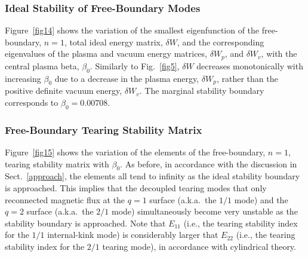 \documentclass[12pt,prb,aps]{revtex4-1}
\begin{document}
\subsubsection{Ideal Stability of Free-Boundary Modes}
Figure~\ref{fig14} shows the variation of the smallest eigenfunction of the free-boundary, $n=1$, 
total ideal energy matrix, $\delta W$, and the corresponding eigenvalues of the plasma and vacuum energy matrices, $\delta W_p$, and $\delta W_v$, with the
central plasma beta, $\beta_0$. Similarly to Fig.~\ref{fig5}, $\delta W$ decreases monotonically with increasing $\beta_0$  due
to a decrease in the plasma energy, $\delta W_p$, rather than the positive definite vacuum energy, $\delta W_v$. 
 The marginal stability boundary corresponds to $\beta_0=0.00708$.  

\subsubsection{Free-Boundary Tearing Stability Matrix}
Figure~\ref{fig15} shows the variation of the elements of the free-boundary, $n=1$, tearing stability matrix with $\beta_0$. As before, in accordance with the discussion in
Sect.~\ref{approach}, the elements all tend to infinity as the ideal stability boundary is approached. This implies that the decoupled tearing modes that
only reconnected magnetic flux at the $q=1$ surface (a.k.a.\ the $1/1$ mode) and the $q=2$ surface  (a.k.a.\ the $2/1$ mode)   simultaneously become very unstable as the
stability boundary is approached. Note that $E_{11}$ (i.e., the tearing stability index for the $1/1$ internal-kink mode) is
considerably larger that $E_{22}$ (i.e., the tearing stability index for the $2/1$ tearing mode), in accordance with cylindrical theory.\cite{freidberg,wesson}
\end{document}
